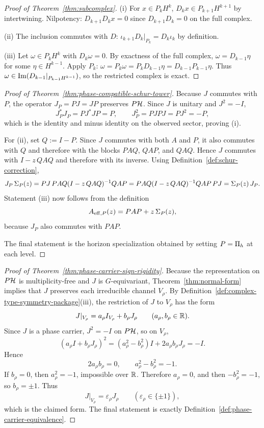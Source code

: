 
\begin{proof}[Proof of Theorem~\ref{thm:subcomplex}]
\label{proof:thm:subcomplex}
(i) For $x \in P_k H^k$, $D_k x \in P_{k+1} H^{k+1}$ by intertwining.
Nilpotency: $D_{k+1} D_k x = 0$ since $D_{k+1} D_k = 0$ on the full complex.

(ii) The inclusion commutes with $D$: $\iota_{k+1} D_k|_{P_k} = D_k \iota_k$ by definition.

(iii) Let $\omega \in P_k H^k$ with $D_k \omega = 0$.
By exactness of the full complex, $\omega = D_{k-1} \eta$ for some $\eta \in H^{k-1}$.
Apply $P_k$: $\omega = P_k \omega = P_k D_{k-1} \eta = D_{k-1} P_{k-1} \eta$.
Thus $\omega \in \mathrm{Im}(D_{k-1}|_{P_{k-1} H^{k-1}})$, so the restricted complex is exact.
\end{proof}

\begin{proof}[Proof of Theorem~\ref{thm:phase-compatible-schur-tower}]
\label{proof:thm:phase-compatible-schur-tower}
Because $J$ commutes with $P$, the operator $J_P=PJ=JP$ preserves $P\mathcal{H}$. Since
$J$ is unitary and $J^2=-I$,
\[
J_P^*J_P=PJ^*JP=P,
\qquad
J_P^2=PJPJ=PJ^2=-P,
\]
which is the identity and minus identity on the observed sector, proving (i).

For (ii), set $Q:=I-P$. Since $J$ commutes with both $A$ and $P$, it also
commutes with $Q$ and therefore with the blocks $PAQ$, $QAP$, and $QAQ$. Hence
$J$ commutes with $I-z\,QAQ$ and therefore with its inverse. Using
Definition~\ref{def:schur-correction},
\[
J_P\,\Sigma_{P}(z)
=
PJ\,PAQ(I-z\,QAQ)^{-1}QAP
=
PAQ(I-z\,QAQ)^{-1}QAP\,PJ
=
\Sigma_{P}(z)\,J_P.
\]
Statement (iii) now follows from the definition
\[
A_{\mathrm{eff},P}(z)=PAP+z\,\Sigma_{P}(z),
\]
because $J_P$ also commutes with $PAP$.

The final statement is the horizon specialization obtained by setting
$P=\Pi_{h}$ at each level.
\end{proof}

\begin{proof}[Proof of Theorem~\ref{thm:phase-carrier-sign-rigidity}]
\label{proof:thm:phase-carrier-sign-rigidity}
Because the representation on $P\mathcal{H}$ is multiplicity-free and $J$ is
$G$-equivariant, Theorem~\ref{thm:normal-form} implies that $J$ preserves each
irreducible channel $V_{\rho}$. By
Definition~\ref{def:complex-type-symmetry-package}(iii), the restriction of
$J$ to $V_{\rho}$ has the form
\[
J|_{V_{\rho}} = a_{\rho} I_{V_{\rho}} + b_{\rho} J_{\rho}
\qquad(a_{\rho},b_{\rho}\in\mathbb{R}).
\]
Since $J$ is a phase carrier, $J^2=-I$ on $P\mathcal{H}$, so on $V_{\rho}$,
\[
(a_{\rho} I + b_{\rho} J_{\rho})^2
=
(a_{\rho}^2-b_{\rho}^2)I + 2a_{\rho}b_{\rho}J_{\rho}
=
-I.
\]
Hence
\[
2a_{\rho}b_{\rho}=0,
\qquad
a_{\rho}^2-b_{\rho}^2=-1.
\]
If $b_{\rho}=0$, then $a_{\rho}^2=-1$, impossible over $\mathbb{R}$. Therefore
$a_{\rho}=0$, and then $-b_{\rho}^2=-1$, so $b_{\rho}=\pm1$. Thus
\[
J|_{V_{\rho}}=\varepsilon_{\rho}J_{\rho}
\qquad(\varepsilon_{\rho}\in\{\pm1\}),
\]
which is the claimed form. The final statement is exactly
Definition~\ref{def:phase-carrier-equivalence}.
\end{proof}

